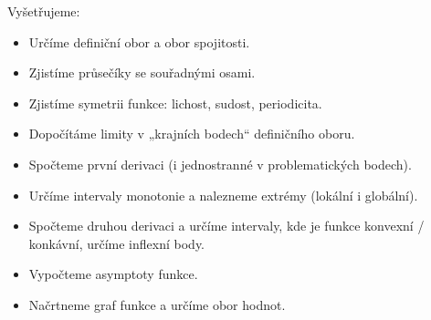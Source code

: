 \documentclass[12pt]{article}					%
\begin{document}
        \begin{poznamka}
            Vyšetřujeme:
            \begin{itemize}
                \item Určíme definiční obor a obor spojitosti.
                \item Zjistíme průsečíky se souřadnými osami.
                \item Zjistíme symetrii funkce: lichost, sudost, periodicita.
                \item Dopočítáme limity v „krajních bodech“ definičního oboru.
                \item Spočteme první derivaci (i jednostranné v problematických bodech).
                \item Určíme intervaly monotonie a nalezneme extrémy (lokální i globální).
                \item Spočteme druhou derivaci a určíme intervaly, kde je funkce konvexní / konkávní, určíme inflexní body.
                \item Vypočteme asymptoty funkce.
                \item Načrtneme graf funkce a určíme obor hodnot.
            \end{itemize}
        \end{poznamka}
\end{document}
